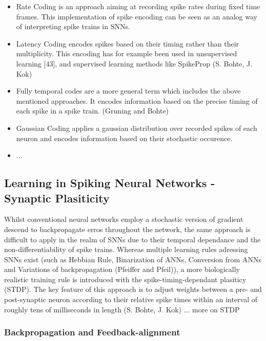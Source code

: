 \documentclass[letterpaper, 10 pt, conference]{ieeeconf}  %
\begin{document}
\begin{itemize}

        \item Rate Coding is an approach aiming at recording spike rates during fixed time frames. This implementation of spike encoding can be seen as an analog way of interpreting spike trains in SNNs.
        \item Latency Coding encodes spikes based on their timing rather than their multiplicity. This encoding has for example been used in unsupervised learning [43], and
        supervised learning methods like SpikeProp (S. Bohte, J. Kok)
        \item Fully temporal codes are a more general term which includes the above mentioned approaches. It encodes information based on the precise
        timing of each spike in a spike train. (Gruning and Bohte)
        \item Gaussian Coding applies a gaussian distribution over recorded spikes of each neuron and encodes information based on their stochastic occurence.
        \item ...
        
\end{itemize}        

\subsection{Learning in Spiking Neural Networks - Synaptic Plasiticity}

Whilst conventional neural networks employ a stochastic version of gradient descend to backpropagate erros throughout the network, the same approach
is difficult to apply in the realm of SNNs due to their temporal dependance and the non-differentiability of spike trains. Whereas multiple learning
rules adressing SNNs exist (such as Hebbian Rule, Binarization of ANNs, Conversion from ANNs and Variations of backpropagation (Pfeiffer and Pfeil)), a more 
biologically realistic training rule is introduced with the spike-timing-dependant plasiticy (STDP). The key feature of this approach is 
to adjust weights between a pre- and post-synaptic neuron according to their relative spike times within an interval of roughly tens of 
milliseconds in length (S. Bohte, J. Kok)
... more on STDP 

\subsubsection{Backpropagation and Feedback-alignment}
\end{document}

